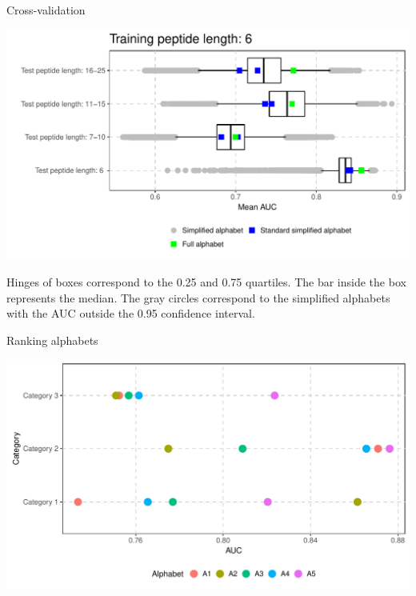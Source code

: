 \documentclass{beamer}\usepackage[]{graphicx}\usepackage[]{color}
\makeatletter
\def\maxwidth{ %
  \ifdim\Gin@nat@width>\linewidth
    \linewidth
  \else
    \Gin@nat@width
  \fi
}
\newenvironment{knitrout}{}{} %
\makeatother
\begin{document}
\begin{frame}{Cross-validation}
\begin{knitrout}
\color{fgcolor}

{\centering \includegraphics[width=\maxwidth]{figure/unnamed-chunk-11-1} 

}



\end{knitrout}
  \small
Hinges of boxes correspond to 
the 0.25 and 0.75 quartiles. The bar inside the box represents the median. The 
gray circles correspond to the simplified alphabets with the AUC outside the 0.95 
confidence interval.
  \end{frame}

\begin{frame}{Ranking alphabets}
\begin{knitrout}
\color{fgcolor}

{\centering \includegraphics[width=\maxwidth]{figure/unnamed-chunk-12-1} 

}



\end{knitrout}
\end{frame}
\end{document}

